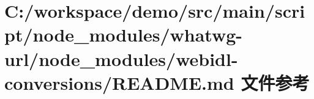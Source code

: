\hypertarget{node__modules_2whatwg-url_2node__modules_2webidl-conversions_2_r_e_a_d_m_e_8md}{}\section{C\+:/workspace/demo/src/main/script/node\+\_\+modules/whatwg-\/url/node\+\_\+modules/webidl-\/conversions/\+R\+E\+A\+D\+ME.md 文件参考}
\label{node__modules_2whatwg-url_2node__modules_2webidl-conversions_2_r_e_a_d_m_e_8md}
